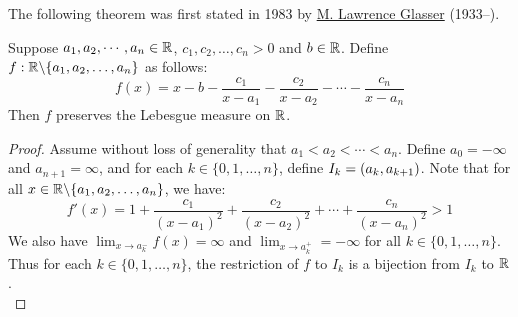\documentclass[main.tex]{subfiles}
\begin{document}
The following theorem was first stated in 1983 by \href{https://wikitia.com/wiki/M._Lawrence_Glasser}{M. Lawrence Glasser} (1933--).

\begin{theorem}\label{glassers_master_theorem}
    Suppose $a_1,a_2,\cdots,a_n\in\R$, $c_1,c_2,\ldots,c_n>0$ and $b\in\R$. Define $f:\R\exc\{a_1,a_2,\ldots,a_n\}$ as follows:
    \begin{equation*}
        f(x) = x-b-\frac{c_1}{x-a_1}-\frac{c_2}{x-a_2}-\cdots-\frac{c_n}{x-a_n}
    \end{equation*}
    Then $f$ preserves the Lebesgue measure on $\R$.
\end{theorem}
\begin{proof}
    Assume without loss of generality that $a_1<a_2<\cdots<a_n$. Define $a_0=-\infty$ and $a_{n+1}=\infty$, and for each $k\in\{0,1,\ldots,n\}$, define $I_k=\qty(a_k,a_{k+1})$. Note that for all $x\in\R\exc\{a_1,a_2,\ldots,a_n\}$, we have:
    \begin{equation*}
        f'(x)
        = 1+\frac{c_1}{(x-a_1)^2}+\frac{c_2}{(x-a_2)^2}+\cdots+\frac{c_n}{(x-a_n)^2}
        > 1
    \end{equation*}
    We also have $\lim_{x\to a_k^-} f(x)=\infty$ and $\lim_{x\to a_k^+}=-\infty$ for all $k\in\{0,1,\ldots,n\}$. Thus for each $k\in\{0,1,\ldots,n\}$, the restriction of $f$ to $I_k$ is a bijection from $I_k$ to $\R$.\\


\end{proof}
\end{document}
